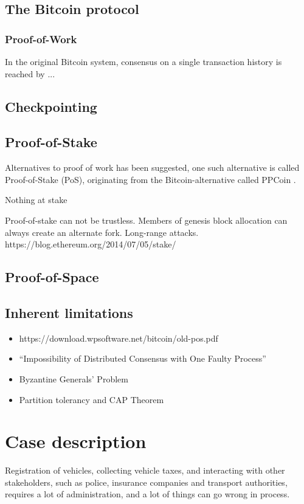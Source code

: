 \documentclass[oneside,a4paper,10pts,article]{memoir}
\begin{document}
\section{The Bitcoin protocol}
 \cite{beck2016blockchain}

\subsection{Proof-of-Work}
In the original Bitcoin system, consensus on a single transaction
history is reached by ...



\section{Checkpointing}

\section{Proof-of-Stake}
Alternatives to proof of work has been suggested, one such alternative
is called Proof-of-Stake (PoS), originating from the
Bitcoin-alternative called PPCoin \cite{king2012ppcoin}. 

Nothing at stake

Proof-of-stake can not be trustless. Members of genesis block
  allocation can always create an alternate fork. Long-range attacks.
https://blog.ethereum.org/2014/07/05/stake/

\section{Proof-of-Space}

\section{Inherent limitations}

\begin{itemize}
\item https://download.wpsoftware.net/bitcoin/old-pos.pdf
\item   ``Impossibility of Distributed Consensus with One Faulty Process''
\item Byzantine Generals' Problem
\item Partition tolerancy and CAP Theorem
\end{itemize}




\chapter{Case description}
\label{sec:case}
Registration of vehicles, collecting vehicle taxes, and interacting
with other stakeholders, such as police, insurance companies and
transport authorities, requires a lot of administration, and a lot of
things can go wrong in process.
\end{document}
